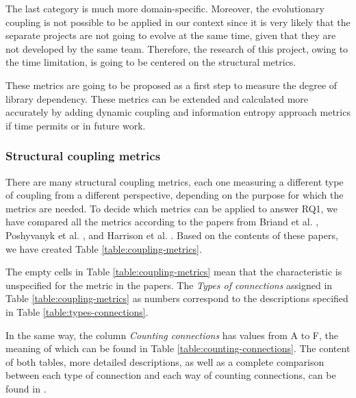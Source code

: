 \bigskip\noindent
The last category is much more domain-specific. Moreover, the evolutionary coupling is not possible to be applied in our context since it is very likely that the separate projects are not going to evolve at the same time, given that they are not developed by the same team. Therefore, the research of this project, owing to the time limitation, is going to be centered on the structural metrics.

These metrics are going to be proposed as a first step to measure the degree of library dependency. These metrics can be extended and calculated more accurately by adding dynamic coupling and information entropy approach metrics if time permits or in future work.

\subsubsection{Structural coupling metrics}
There are many structural coupling metrics, each one measuring a different type of coupling from a different perspective, depending on the purpose for which the metrics are needed.
To decide which metrics can be applied to answer RQ1, we have compared all the metrics according to the papers from Briand et al. \cite{briand1999unified}, Poshyvanyk et al. \cite{poshyvanyk2006conceptual}, and Harrison et al. \cite{harrison1998coupling}. Based on the contents of these papers, we have created Table \ref{table:coupling-metrics}.

The empty cells in Table \ref{table:coupling-metrics} mean that the characteristic is unspecified for the metric in the papers. The \textit{Types of connections} assigned in Table \ref{table:coupling-metrics} as numbers correspond to the descriptions specified in Table \ref{table:types-connections}.

In the same way, the column \textit{Counting connections} has values from A to F, the meaning of which can be found in Table \ref{table:counting-connections}.
The content of both tables, more detailed descriptions, as well as a complete comparison between each type of connection and each way of counting connections, can be found in \cite{briand1999unified}.

